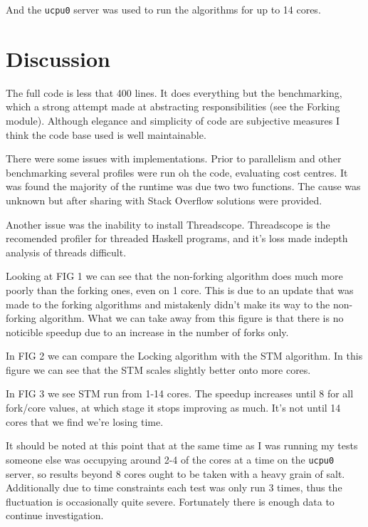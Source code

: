 \documentclass{bioinfo}
\begin{document}
\begin{methods}
And the \texttt{ucpu0} server was used to run the algorithms for up to 14 cores.

\end{methods}

\section{Discussion}

The full code is less that 400 lines. It does everything but the benchmarking, which a strong attempt made at abstracting responsibilities (see the Forking module). Although elegance and simplicity of code are subjective measures I think the code base used is well maintainable.

There were some issues with implementations. Prior to parallelism and other benchmarking several profiles were run oh the code, evaluating cost centres. It was found the majority of the runtime was due two two functions. The cause was unknown but after sharing with Stack Overflow solutions were provided. 

Another issue was the inability to install Threadscope. Threadscope is the recomended profiler for threaded Haskell programs, and it's loss made indepth analysis of threads difficult. 

Looking at FIG 1 we can see that the non-forking algorithm does much more poorly than the forking ones, even on 1 core. This is due to an update that was made to the forking algorithms and mistakenly didn't make its way to the non-forking algorithm. 
What we can take away from this figure is that there is no noticible speedup due to an increase in the number of forks only.

In FIG 2 we can compare the Locking algorithm with the STM algorithm. In this figure we can see that the STM scales slightly better onto more cores.

In FIG 3 we see STM run from 1-14 cores. The speedup increases until 8 for all fork/core values, at which stage it stops improving as much. It's not until 14 cores that we find we're losing time.

It should be noted at this point that at the same time as I was running my tests someone else was occupying around 2-4 of the cores at a time on the \texttt{ucpu0} server, so results beyond 8 cores ought to be taken with a heavy grain of salt. Additionally due to time constraints each test was only run 3 times, thus the fluctuation is occasionally quite severe. Fortunately there is enough data to continue investigation.
\end{document}
